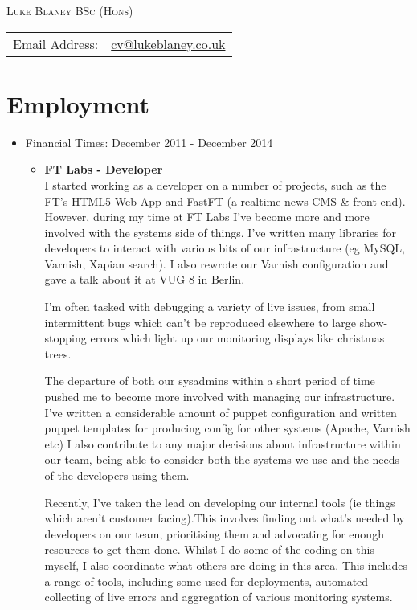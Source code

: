 \documentclass[a4paper]{article}
\begin{document}
\begin{center}\textsc{\LARGE Luke Blaney BSc (Hons)}\end{center}

\begin{tabular}{ l l }

Email Address: & \href{mailto:cv@lukeblaney.co.uk}{cv@lukeblaney.co.uk}\\

\end{tabular}

\section*{Employment}


\begin{itemize}

\item Financial Times: December 2011 - December 2014
\begin{itemize}\item
 {\bf FT Labs - Developer}\\
I started working as a developer on a number of projects, such as the FT's HTML5 Web App and FastFT (a realtime news CMS \& front end). However, during my time at FT Labs I've become more and more involved with the systems side of things. I've written many libraries for developers to interact with various bits of our infrastructure (eg MySQL, Varnish, Xapian search). I also rewrote our Varnish configuration and gave a talk about it at VUG 8 in Berlin.\par
I'm often tasked with debugging a variety of live issues, from small intermittent bugs which can't be reproduced elsewhere to large show-stopping errors which light up our monitoring displays like christmas trees.\par
The departure of both our sysadmins within a short period of time pushed me to become more involved with managing our infrastructure. I've written a considerable amount of puppet configuration and written puppet templates for producing config for other systems (Apache, Varnish etc) I also contribute to any major decisions about infrastructure within our team, being able to consider both the systems we use and the needs of the developers using them.\par
Recently, I've taken the lead on developing our internal tools (ie things which aren't customer facing).This involves finding out what's needed by developers on our team, prioritising them and advocating for enough resources to get them done. Whilst I do some of the coding on this myself, I also coordinate what others are doing in this area. This includes a range of tools, including some used for deployments, automated collecting of live errors and aggregation of various monitoring systems.
\end{itemize}


\end{itemize}
\end{document}
